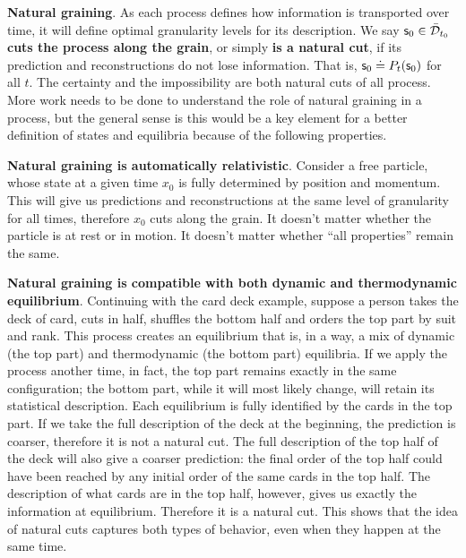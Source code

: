 \documentclass[10pt, onecolumn, longbibliography, nofootinbib]{revtex4-2}
\begin{document}
\textbf{Natural graining}. As each process defines how information is transported over time, it will define optimal granularity levels for its description. We say $\mathsf{s}_0 \in \bar{\mathcal{D}}_{t_0}$ \textbf{cuts the process along the grain}, or simply \textbf{is a natural cut}, if its prediction and reconstructions do not lose information. That is, $\mathsf{s}_0 \doteq P_t(\mathsf{s}_0)$ for all $t$. The certainty and the impossibility are both natural cuts of all process. More work needs to be done to understand the role of natural graining in a process, but the general sense is this would be a key element for a better definition of states and equilibria because of the following properties.

\textbf{Natural graining is automatically relativistic}. Consider a free particle, whose state at a given time $x_0$ is fully determined by position and momentum. This will give us predictions and reconstructions at the same level of granularity for all times, therefore $x_0$ cuts along the grain. It doesn't matter whether the particle is at rest or in motion. It doesn't matter whether ``all properties'' remain the same.

\textbf{Natural graining is compatible with both dynamic and thermodynamic equilibrium}. Continuing with the card deck example, suppose a person takes the deck of card, cuts in half, shuffles the bottom half and orders the top part by suit and rank. This process creates an equilibrium that is, in a way, a mix of dynamic (the top part) and thermodynamic (the bottom part) equilibria. If we apply the process another time, in fact, the top part remains exactly in the same configuration; the bottom part, while it will most likely change, will retain its statistical description.  Each equilibrium is fully identified by the cards in the top part. If we take the full description of the deck at the beginning, the prediction is coarser, therefore it is not a natural cut. The full description of the top half of the deck will also give a coarser prediction: the final order of the top half could have been reached by any initial order of the same cards in the top half. The description of what cards are in the top half, however, gives us exactly the information at equilibrium. Therefore it is a natural cut. This shows that the idea of natural cuts captures both types of behavior, even when they happen at the same time.
\end{document}
